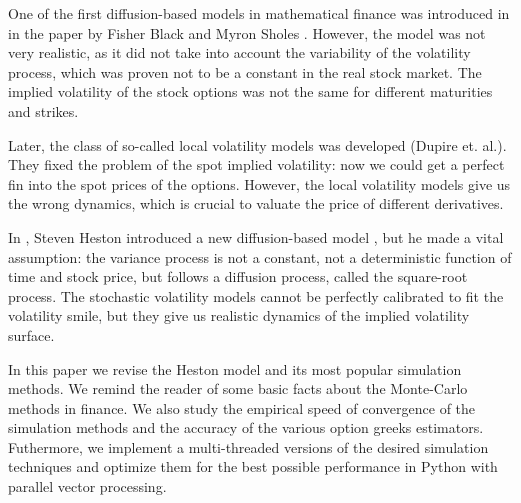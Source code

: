 One of the first diffusion-based models in mathematical finance was introduced in 
\citeyear{BlackSholes1973} in the paper by Fisher Black and Myron Sholes \cite{BlackSholes1973}. 
However, the model was not very realistic, as it did not take into account the variability of
the volatility process, which was proven not to be a constant in the real stock market.
The implied volatility of the stock options was not the same for different maturities and
strikes.

Later, the class of so-called local volatility models was developed (Dupire et. al.). They
fixed the problem of the spot implied volatility: now we could get a perfect fin into the spot 
prices of the options. However, the local volatility models give us the wrong dynamics,
which is crucial to valuate the price of different derivatives.

In \citeyear{Heston1993}, Steven Heston introduced a new diffusion-based model \cite{Heston1993}, but he made a 
vital assumption: the variance process is not a constant, not a deterministic function of time and 
stock price, but follows a diffusion process, called the square-root process. The 
stochastic volatility models cannot be perfectly calibrated to fit the volatility smile, but
they give us realistic dynamics of the implied volatility surface.

In this paper we revise the Heston model and its most popular simulation methods. We remind
the reader of some basic facts about the Monte-Carlo methods in finance. We also study the 
empirical speed of convergence of the simulation methods and the accuracy of the various option 
greeks estimators. Futhermore, we implement a multi-threaded versions of the desired simulation techniques 
and optimize them for the best possible performance in Python with parallel vector processing.